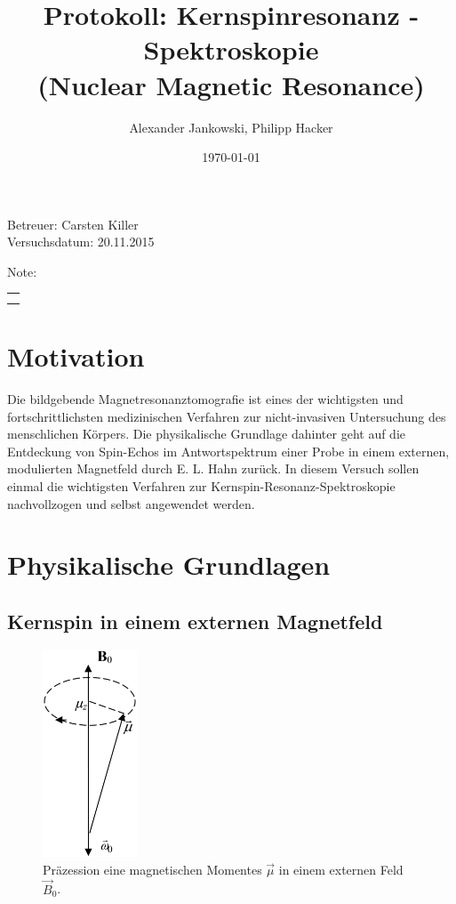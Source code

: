 \documentclass[numbers=noenddot,a4paper,notitlepage,twoside,BCOR15mm]{scrartcl}
\title{Protokoll: Kernspinresonanz -Spektroskopie\\ (Nuclear Magnetic Resonance)} %
\author{Alexander Jankowski, Philipp Hacker}
\date{\today}
\newcommand{\ix}[1]{_\text{#1}}
\begin{document}
	\maketitle
	\begin{center}
		Betreuer: Carsten Killer\\ %
		Versuchsdatum: 20.11.2015\\ %
		\begin{table}[h]
			\centering
			Note: %
			\begin{tabularx}{1.5cm}{|X|}
				\hline \\ \\
				\hline
			\end{tabularx}
		\end{table}
	\end{center}
	\vspace*{\fill}
	\tableofcontents
	\vfill
	\clearpage
	\section{Motivation}

		Die bildgebende Magnetresonanztomografie ist eines der wichtigsten und fortschrittlichsten medizinischen Verfahren zur nicht-invasiven Untersuchung des menschlichen Körpers. Die physikalische Grundlage dahinter geht auf die Entdeckung von Spin-Echos im Antwortspektrum einer Probe in einem externen, modulierten Magnetfeld durch E. L. Hahn \cite{SpinEcho} zurück. In diesem Versuch sollen einmal die wichtigsten Verfahren zur Kernspin-Resonanz-Spektroskopie nachvollzogen und selbst angewendet werden.

	\clearpage
	\section{Physikalische Grundlagen}

		\subsection{Kernspin in einem externen  Magnetfeld}

				\begin{figure}
					\centering
					\includegraphics[width=0.25\textwidth]{praezess.png}
					\caption{Präzession eine magnetischen Momentes $\vec{\mu}$ in einem externen Feld $\vec{B}\ix{0}$. \cite{EMAUGreifswaldNMR}}
				\end{figure}
\end{document}
